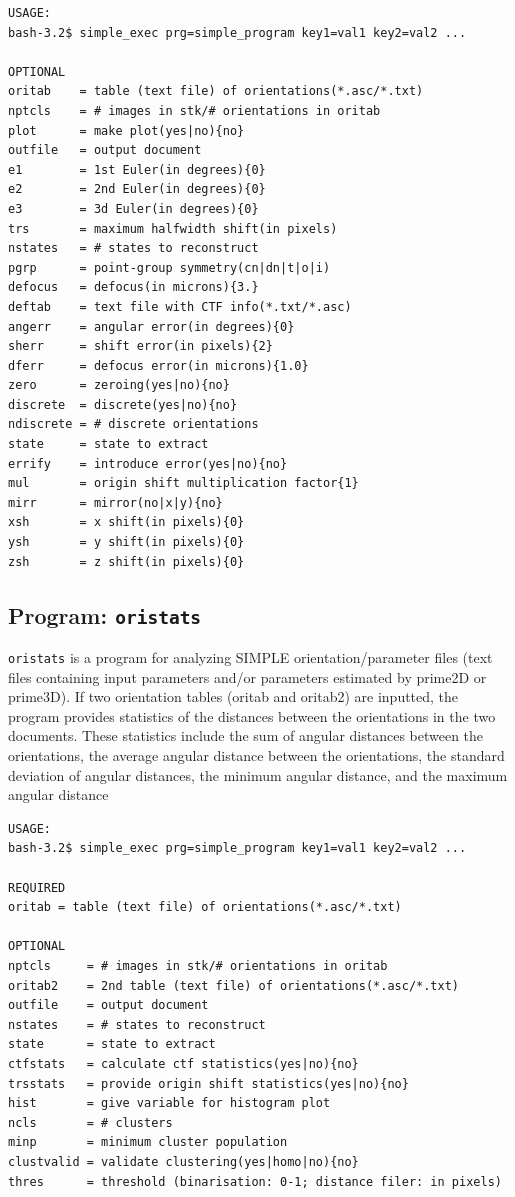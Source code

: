 \documentclass[a4paper,11pt]{article}
\newcommand{\prgname}[1]{\textcolor{NavyBlue}{\texttt{#1}}}
\begin{document}
\begin{verbatim}
USAGE:
bash-3.2$ simple_exec prg=simple_program key1=val1 key2=val2 ...

OPTIONAL
oritab    = table (text file) of orientations(*.asc/*.txt)
nptcls    = # images in stk/# orientations in oritab
plot      = make plot(yes|no){no}
outfile   = output document
e1        = 1st Euler(in degrees){0}
e2        = 2nd Euler(in degrees){0}
e3        = 3d Euler(in degrees){0}
trs       = maximum halfwidth shift(in pixels)
nstates   = # states to reconstruct
pgrp      = point-group symmetry(cn|dn|t|o|i)
defocus   = defocus(in microns){3.}
deftab    = text file with CTF info(*.txt/*.asc)
angerr    = angular error(in degrees){0}
sherr     = shift error(in pixels){2}
dferr     = defocus error(in microns){1.0}
zero      = zeroing(yes|no){no}
discrete  = discrete(yes|no){no}
ndiscrete = # discrete orientations
state     = state to extract
errify    = introduce error(yes|no){no}
mul       = origin shift multiplication factor{1}
mirr      = mirror(no|x|y){no}
xsh       = x shift(in pixels){0}
ysh       = y shift(in pixels){0}
zsh       = z shift(in pixels){0}
\end{verbatim}

\subsection{Program: \prgname{oristats}}
\label{oristats}
\prgname{oristats} is a program for analyzing SIMPLE orientation/parameter files (text files containing input parameters and/or parameters estimated by prime2D or prime3D). If two orientation tables (oritab and oritab2) are inputted, the program provides statistics of the distances between the orientations in the two documents. These statistics include the sum of angular distances between the orientations, the average angular distance between the orientations, the standard deviation of angular distances, the minimum angular distance, and the maximum angular distance

\begin{verbatim}
USAGE:
bash-3.2$ simple_exec prg=simple_program key1=val1 key2=val2 ...

REQUIRED
oritab = table (text file) of orientations(*.asc/*.txt)

OPTIONAL
nptcls     = # images in stk/# orientations in oritab
oritab2    = 2nd table (text file) of orientations(*.asc/*.txt)
outfile    = output document
nstates    = # states to reconstruct
state      = state to extract
ctfstats   = calculate ctf statistics(yes|no){no}
trsstats   = provide origin shift statistics(yes|no){no}
hist       = give variable for histogram plot
ncls       = # clusters
minp       = minimum cluster population
clustvalid = validate clustering(yes|homo|no){no}
thres      = threshold (binarisation: 0-1; distance filer: in pixels)
\end{verbatim}
\end{document}
